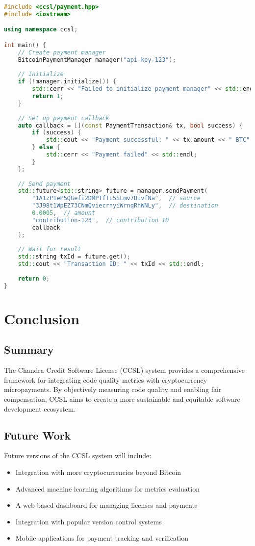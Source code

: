 \documentclass[11pt,a4paper]{report}
\begin{document}
\begin{lstlisting}[language=C++]
#include <ccsl/payment.hpp>
#include <iostream>

using namespace ccsl;

int main() {
    // Create payment manager
    BitcoinPaymentManager manager("api-key-123");
    
    // Initialize
    if (!manager.initialize()) {
        std::cerr << "Failed to initialize payment manager" << std::endl;
        return 1;
    }
    
    // Set up payment callback
    auto callback = [](const PaymentTransaction& tx, bool success) {
        if (success) {
            std::cout << "Payment successful: " << tx.amount << " BTC" << std::endl;
        } else {
            std::cerr << "Payment failed" << std::endl;
        }
    };
    
    // Send payment
    std::future<std::string> future = manager.sendPayment(
        "1A1zP1eP5QGefi2DMPTfTL5SLmv7DivfNa",  // source
        "3J98t1WpEZ73CNmQviecrnyiWrnqRhWNLy",  // destination
        0.0005,  // amount
        "contribution-123",  // contribution ID
        callback
    );
    
    // Wait for result
    std::string txId = future.get();
    std::cout << "Transaction ID: " << txId << std::endl;
    
    return 0;
}
\end{lstlisting}

\chapter{Conclusion}

\section{Summary}
The Chandra Credit Software License (CCSL) system provides a comprehensive framework for integrating code quality metrics with cryptocurrency micropayments. By objectively measuring code quality and enabling fair compensation, CCSL aims to create a more sustainable and equitable software development ecosystem.

\section{Future Work}
Future versions of the CCSL system will include:

\begin{itemize}
    \item Integration with more cryptocurrencies beyond Bitcoin
    \item Advanced machine learning algorithms for metrics evaluation
    \item A web-based dashboard for managing licenses and payments
    \item Integration with popular version control systems
    \item Mobile applications for payment tracking and verification
\end{itemize}
\end{document}
